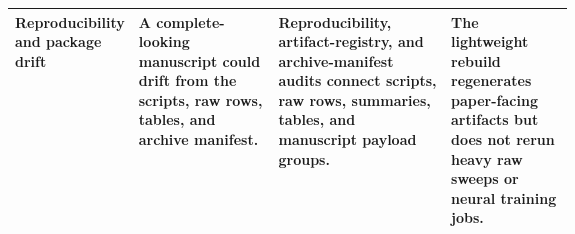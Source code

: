 \begin{tabularx}{\linewidth}{>{\raggedright\arraybackslash}p{0.18\linewidth}>{\raggedright\arraybackslash}p{0.25\linewidth}>{\raggedright\arraybackslash}X>{\raggedright\arraybackslash}p{0.22\linewidth}}
Reproducibility and package drift & A complete-looking manuscript could drift from the scripts, raw rows, tables, and archive manifest. & Reproducibility, artifact-registry, and archive-manifest audits connect scripts, raw rows, summaries, tables, and manuscript payload groups. & The lightweight rebuild regenerates paper-facing artifacts but does not rerun heavy raw sweeps or neural training jobs. \\
\bottomrule
\end{tabularx}
